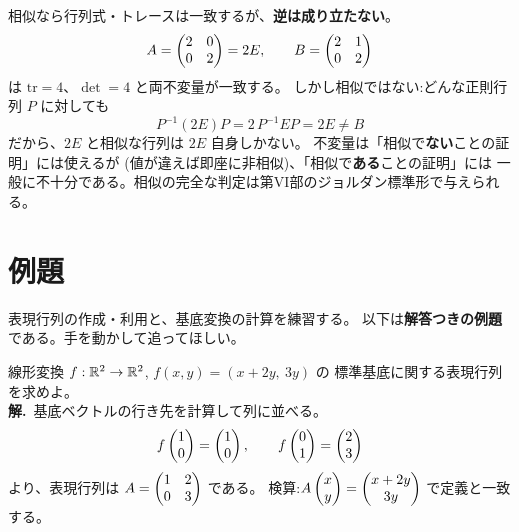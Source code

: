 \begin{hanrei}[不変量が一致しても相似とは限らない]\label{hanrei:repmat-invariant}
相似なら行列式・トレースは一致するが、\textbf{逆は成り立たない}。
\[
A = \begin{pmatrix}2 & 0 \\ 0 & 2\end{pmatrix} = 2E, \qquad B = \begin{pmatrix}2 & 1 \\ 0 & 2\end{pmatrix}
\]
は $\mathrm{tr} = 4$、$\det = 4$ と両不変量が一致する。
しかし相似ではない:どんな正則行列 $P$ に対しても
\[
P^{-1}(2E)P = 2\,P^{-1}EP = 2E \neq B
\]
だから、$2E$ と相似な行列は $2E$ 自身しかない。
不変量は「相似で\textbf{ない}ことの証明」には使えるが
(値が違えば即座に非相似)、「相似で\textbf{ある}ことの証明」には
一般に不十分である。相似の完全な判定は第VI部のジョルダン標準形で与えられる。
\end{hanrei}

\section{例題}

表現行列の作成・利用と、基底変換の計算を練習する。
以下は\textbf{解答つきの例題}である。手を動かして追ってほしい。

\begin{rei}[例題・基本(標準基底に関する表現行列)]\label{rei:repmat-std}
線形変換 $f : \mathbb{R}^2 \to \mathbb{R}^2$, $f(x, y) = (x + 2y,\ 3y)$ の
標準基底に関する表現行列を求めよ。\\
\textbf{解.}\ 基底ベクトルの行き先を計算して列に並べる。
\[
f\begin{pmatrix}1 \\ 0\end{pmatrix} = \begin{pmatrix}1 \\ 0\end{pmatrix}, \qquad f\begin{pmatrix}0 \\ 1\end{pmatrix} = \begin{pmatrix}2 \\ 3\end{pmatrix}
\]
より、表現行列は $A = \begin{pmatrix}1 & 2 \\ 0 & 3\end{pmatrix}$ である。
検算:$A\begin{pmatrix}x \\ y\end{pmatrix} = \begin{pmatrix}x + 2y \\ 3y\end{pmatrix}$ で定義と一致する。
\end{rei}

